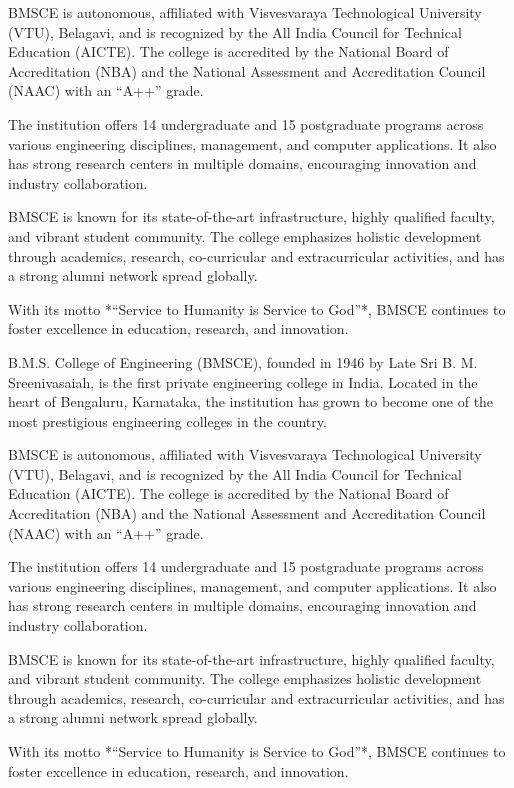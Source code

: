 \documentclass[12pt,a4paper]{report}
\begin{document}
BMSCE is autonomous, affiliated with Visvesvaraya Technological University (VTU), Belagavi, 
and is recognized by the All India Council for Technical Education (AICTE). The college is 
accredited by the National Board of Accreditation (NBA) and the National Assessment and 
Accreditation Council (NAAC) with an “A++” grade.

The institution offers 14 undergraduate and 15 postgraduate programs across various 
engineering disciplines, management, and computer applications. It also has strong research 
centers in multiple domains, encouraging innovation and industry collaboration. 

BMSCE is known for its state-of-the-art infrastructure, highly qualified faculty, and vibrant 
student community. The college emphasizes holistic development through academics, research, 
co-curricular and extracurricular activities, and has a strong alumni network spread 
globally. 

With its motto *“Service to Humanity is Service to God”*, BMSCE continues to foster 
excellence in education, research, and innovation.

B.M.S. College of Engineering (BMSCE), founded in 1946 by Late Sri B. M. Sreenivasaiah, 
is the first private engineering college in India. Located in the heart of Bengaluru, 
Karnataka, the institution has grown to become one of the most prestigious engineering 
colleges in the country. 

BMSCE is autonomous, affiliated with Visvesvaraya Technological University (VTU), Belagavi, 
and is recognized by the All India Council for Technical Education (AICTE). The college is 
accredited by the National Board of Accreditation (NBA) and the National Assessment and 
Accreditation Council (NAAC) with an “A++” grade.

The institution offers 14 undergraduate and 15 postgraduate programs across various 
engineering disciplines, management, and computer applications. It also has strong research 
centers in multiple domains, encouraging innovation and industry collaboration. 

BMSCE is known for its state-of-the-art infrastructure, highly qualified faculty, and vibrant 
student community. The college emphasizes holistic development through academics, research, 
co-curricular and extracurricular activities, and has a strong alumni network spread 
globally. 

With its motto *“Service to Humanity is Service to God”*, BMSCE continues to foster 
excellence in education, research, and innovation.
\end{document}
